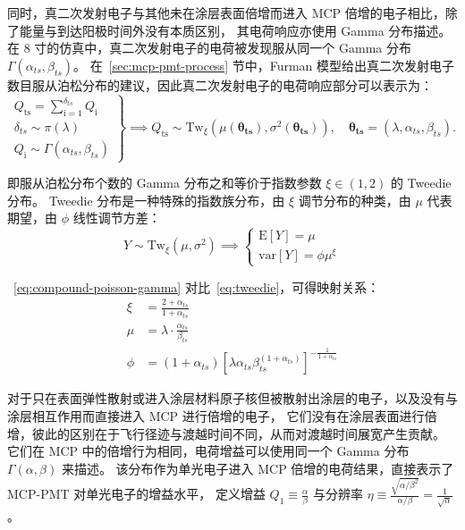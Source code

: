 同时，真二次发射电子与其他未在涂层表面倍增而进入 MCP 倍增的电子相比，除了能量与到达阳极时间外没有本质区别，
其电荷响应亦使用 Gamma 分布描述。在 8 寸的仿真中，真二次发射电子的电荷被发现服从同一个 Gamma 分布 $\Gamma(\alpha_{ts}, \beta_{ts})$。
在~\ref{sec:mcp-pmt-process} 节中，Furman 模型给出真二次发射电子数目服从泊松分布的建议，因此真二次发射电子的电荷响应部分可以表示为：
\begin{equation}
    \left.
        \begin{array}{c}
        Q_\mathrm{ts}=\sum_{\mathrm{i=1}}^{\delta_{ts}}Q_\mathrm{i}\\
        \delta_{ts}\sim\pi(\lambda)\\
        Q_\mathrm{i}\sim\Gamma(\alpha_{ts},\beta_{ts})
        \end{array}
    \right\}\implies
    Q_\mathrm{ts}\sim\mathrm{Tw}_{\xi}
    \left(\mu(\boldsymbol{\theta_{ts}}),\sigma^2(\boldsymbol{\theta_{ts}})\right),\quad
    \boldsymbol{\theta_{ts}}=(\lambda, \alpha_{ts},\beta_{ts}).
    \label{eq:compound-poisson-gamma}
\end{equation}

即服从泊松分布个数的 Gamma 分布之和等价于指数参数 $\xi\in(1, 2)$ 的 Tweedie 分布。
Tweedie 分布是一种特殊的指数族分布，由 $\xi$ 调节分布的种类，由 $\mu$ 代表期望，由 $\phi$ 线性调节方差：
\begin{equation}
    Y\sim\mathrm{Tw}_{\xi}(\mu, \sigma^2)\implies 
    \left\{
        \begin{array}{c}
        \mathrm{E}[Y]=\mu \\
        \mathrm{var}[Y]=\phi\mu^{\xi}
        \end{array}
    \right.
    \label{eq:tweedie}
\end{equation}

~\eqref{eq:compound-poisson-gamma} 对比~\eqref{eq:tweedie}，可得映射关系：
\begin{align}
    \xi & = \frac{2+\alpha_{ts}}{1+\alpha_{ts}}\\
    \mu & = \lambda\cdot\frac{\alpha_{ts}}{\beta_{ts}}\\
    \phi & = (1+\alpha_{ts})\left[\lambda\alpha_{ts}\beta_{ts}^{(1+\alpha_{ts})}\right]^{-\frac{1}{1+\alpha_{ts}}}
\end{align}

对于只在表面弹性散射或进入涂层材料原子核但被散射出涂层的电子，以及没有与涂层相互作用而直接进入 MCP 进行倍增的电子，
它们没有在涂层表面进行倍增，彼此的区别在于飞行径迹与渡越时间不同，从而对渡越时间展宽产生贡献。
它们在 MCP 中的倍增行为相同，电荷增益可以使用同一个 Gamma 分布 $\Gamma(\alpha, \beta)$ 来描述。
该分布作为单光电子进入 MCP 倍增的电荷结果，直接表示了 MCP-PMT 对单光电子的增益水平，
定义增益 $Q_1\equiv\frac{\alpha}{\beta}$ 与分辨率 $\eta\equiv\frac{\sqrt{\alpha/\beta^2}}{\alpha/\beta}=\frac{1}{\sqrt{\alpha}}$。

